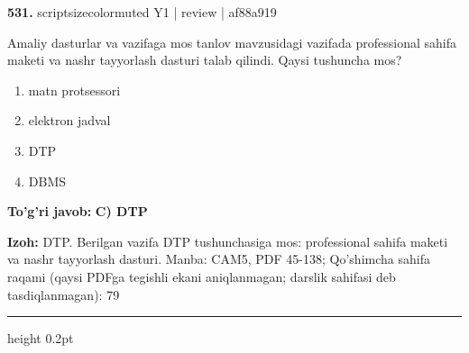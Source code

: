 \documentclass[10pt,a4paper]{article}
\begin{document}
{\bfseries\sffamily\color{ink} 531.} {scriptsizecolor{muted} Y1 | review | af88a919}
\par
Amaliy dasturlar va vazifaga mos tanlov mavzusidagi vazifada professional sahifa maketi va nashr tayyorlash dasturi talab qilindi. Qaysi tushuncha mos?
\begin{enumerate}[label=\Alph*),leftmargin=9mm]
\item matn protsessori
\item elektron jadval
\item DTP
\item DBMS
\end{enumerate}
\begin{tcolorbox}[enhanced,breakable,colback=teal!4,colframe=teal!60!black,boxrule=0.45pt,arc=1.2mm,left=2.7mm,right=2.7mm,top=1.8mm,bottom=1.8mm,before skip=2mm,after skip=2mm]
{\bfseries\sffamily\color{teal}To'g'ri javob:} \textbf{C) DTP}
\par\smallskip
{\bfseries Izoh:} DTP. Berilgan vazifa DTP tushunchasiga mos: professional sahifa maketi va nashr tayyorlash dasturi. Manba: CAM5, PDF 45-138; Qo'shimcha sahifa raqami (qaysi PDFga tegishli ekani aniqlanmagan; darslik sahifasi deb tasdiqlanmagan): 79
\end{tcolorbox}
\vspace{2mm}\hrule height 0.2pt\vspace{3mm}
\end{document}
